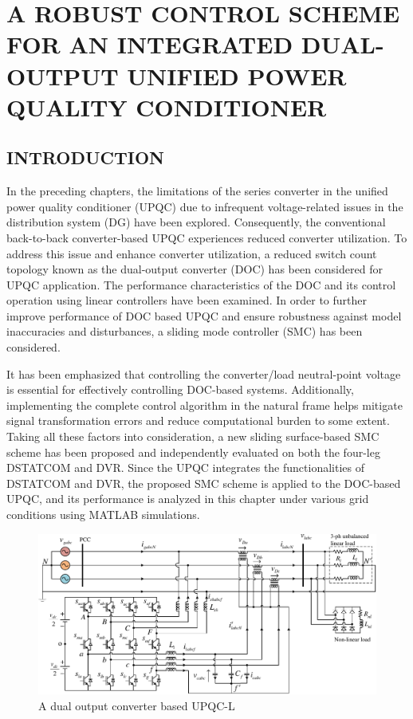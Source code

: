 \chapter{A ROBUST CONTROL SCHEME FOR AN INTEGRATED DUAL-OUTPUT UNIFIED POWER QUALITY CONDITIONER}
\label{6.Chap:DOCUPQC}
\section{INTRODUCTION}
In the preceding chapters, the limitations of the series converter in the unified power quality conditioner (UPQC) due to infrequent voltage-related issues in the distribution system (DG) have been explored. Consequently, the conventional back-to-back converter-based UPQC experiences reduced converter utilization. To address this issue and enhance converter utilization, a reduced switch count topology known as the dual-output converter (DOC) has been considered for UPQC application. The performance characteristics of the DOC and its control operation using linear controllers have been examined. In order to further improve performance of DOC based UPQC and ensure robustness against model inaccuracies and disturbances, a sliding mode controller (SMC) has been considered.

It has been emphasized that controlling the converter/load neutral-point voltage is essential for effectively controlling DOC-based systems. Additionally, implementing the complete control algorithm in the natural frame helps mitigate signal transformation errors and reduce computational burden to some extent. Taking all these factors into consideration, a new sliding surface-based SMC scheme has been proposed and independently evaluated on both the four-leg DSTATCOM and DVR. Since the UPQC integrates the functionalities of DSTATCOM and DVR, the proposed SMC scheme is applied to the DOC-based UPQC, and its performance is analyzed in this chapter under various grid conditions using MATLAB simulations. %
    
\begin{figure}   
	\centering
	\includegraphics[scale=1]{figures/Chapter_6/Mine/4leg_UPQC_L.pdf}
	\caption{A dual output converter based UPQC-L}
	\label{fig6.1}
\end{figure}

